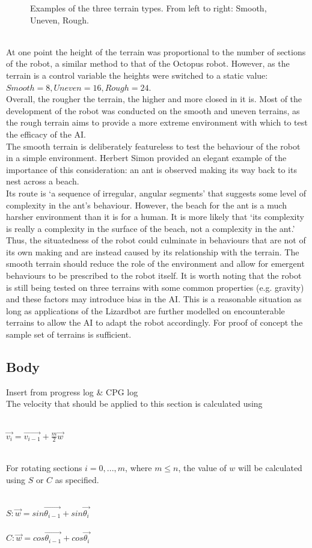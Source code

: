 \documentclass{article}
\begin{document}
\begin{figure}[h]
\caption{Examples of the three terrain types. From left to right: Smooth, Uneven, Rough.}
\end{figure}\\
At one point the height of the terrain was proportional to the number of sections of the robot, a similar method to that of the Octopus robot. However, as the terrain is a control variable the heights were switched to a static value: $Smooth=8, Uneven=16, Rough=24$.\\
Overall, the rougher the terrain, the higher and more closed in it is. Most of the development of the robot was conducted on the smooth and uneven terrains, as the rough terrain aims to provide a more extreme environment with which to test the efficacy of the AI.\\
The smooth terrain is deliberately featureless to test the behaviour of the robot in a simple environment. Herbert Simon provided an elegant example of the importance of this consideration: an ant is observed making its way back to its nest across a beach.\\
Its route is ‘a sequence of irregular, angular segments’ that suggests some level of complexity in the ant's behaviour. However, the beach for the ant is a much harsher environment than it is for a human. It is more likely that ‘its complexity is really a complexity in the surface of the beach, not a complexity in the ant.’ Thus, the situatedness of the robot could culminate in behaviours that are not of its own making and are instead caused by its relationship with the terrain. The smooth terrain should reduce the role of the environment and allow for emergent behaviours to be prescribed to the robot itself. It is worth noting that the robot is still being tested on three terrains with some common properties (e.g. gravity) and these factors may introduce bias in the AI. This is a reasonable situation as long as applications of the Lizardbot are further modelled on encounterable terrains to allow the AI to adapt the robot accordingly. For proof of concept the sample set of terrains is sufficient.
\subsection{Body}
Insert from progress log \& CPG log\\
The velocity that should be applied to this section is calculated using\\\\
\begin{Large}
$\overrightarrow{v_{i}} = \overrightarrow{v_{i-1}} + \frac{m}{2}\overrightarrow{w} $\\\\
\end{Large}
For rotating sections $i = 0, ..., m$, where $m \leq n$, the value of $w$ will be calculated using $S$ or $C$ as specified.\\\\
\begin{Large}
$S: \overrightarrow{w} = sin\overrightarrow{\theta_{i-1}} + sin\overrightarrow{\theta_{i}}$\\\\
$C: \overrightarrow{w} = cos\overrightarrow{\theta_{i-1}} + cos\overrightarrow{\theta_{i}}$
\end{Large}
\end{document}
